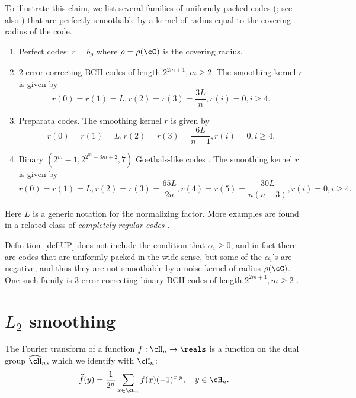 \documentclass{amsart}
\theoremstyle{remark}
\begin{document}
To illustrate this claim, we list several families of uniformly packed codes (\cite{semakov1971uniformly,goethals1975uniformily}; see also \cite{tokareva2007upper}) that are perfectly 
smoothable by a kernel of radius equal to the covering radius of the code.

    \begin{enumerate}[label = (\roman*)]
        \item Perfect codes: $r = b_{\rho}$ where $\rho=\rho(\cC)$ is the covering radius. 
        \item 2-error correcting BCH codes of length $2^{2m+1}, m\ge 2$. The smoothing kernel $r$ is given by
        $$r(0)=r(1) = L, r(2)=r(3)=\frac{3L}{n}, r(i)=0, i\geq 4.$$
        \item Preparata codes. The smoothing kernel $r$ is given by
        $$r(0)=r(1) = L, r(2)=r(3)=\frac{6L}{n-1}, r(i)=0, i\geq 4.$$
        \item Binary $(2^m-1,2^{2^m-3m+2},7)$ Goethals-like codes \cite{goethals1975uniformily}. The smoothing kernel $r$ is given by
        $$r(0)=r(1) = L, r(2)=r(3)=\frac{65L}{2n}, r(4)=r(5)=\frac{30L}{n(n-3)}, r(i)=0, i\geq 4.$$
  \end{enumerate}
Here $L$ is a generic notation for the normalizing factor.
More examples are found in a related class of {\em completely regular codes} \cite{borges2019completely}.

Definition~\ref{def:UP} does not include the condition that $\alpha_i\ge0$, and in fact there are codes that are uniformly packed in the wide sense, but some of the
$\alpha_i$'s are negative, and thus they are not smoothable by a noise kernel of radius
$\rho(\cC)$. One such family is 3-error-correcting binary BCH codes of length $2^{2m+1}, m\ge 2$ \cite{goethals1975uniformily}.

\appendix

\section{$L_2$ smoothing}

The Fourier transform of a function $f:\cH _n \rightarrow \reals$ is a function on the dual group $\widehat\cH_n$, which we identify with $\cH_n$:
\begin{equation}\label{eq:ft}
 \widehat{f}(y) = \frac{1}{2^n}\sum_{x\in {\cH _n}} f(x)(-1)^{x \cdot y}, \quad y\in\cH_n.
\end{equation}
\end{document}
